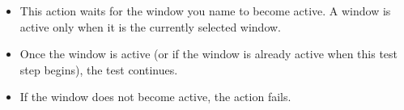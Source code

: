 \begin{itemize}
\item This action waits for the window you name to become active. A window is active only when it is the currently selected window.
\item Once the window is active (or if the window is already active when this test step begins), the test continues.
\item If the window does not become active, the action fails.
\end{itemize}

